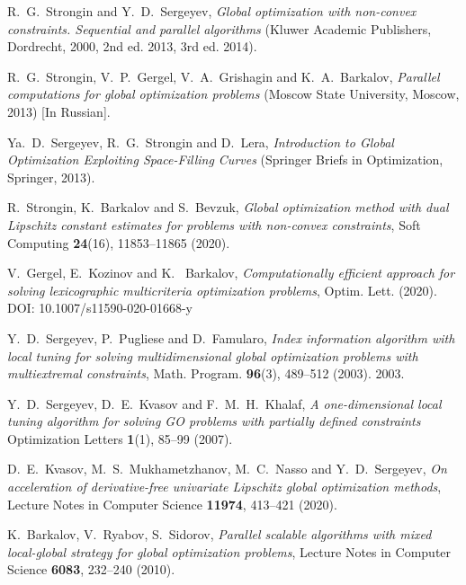 \documentclass[
11pt,%
tightenlines,%
twoside,%
onecolumn,%
nofloats,%
nobibnotes,%
nofootinbib,%
superscriptaddress,%
noshowpacs,%
centertags]%
{revtex4}
\begin{document}
\begin{thebibliography}{99}
	
R.~G.~Strongin and Y.~D.~Sergeyev, \textit{Global optimization with non-convex constraints. Sequential and parallel algorithms} (Kluwer Academic Publishers, Dordrecht, 2000, 2nd ed. 2013, 3rd ed. 2014).

R.~G.~Strongin, V.~P.~Gergel, V.~A.~Grishagin and K.~A.~Barkalov, \textit{Parallel computations for global optimization problems} (Moscow State University, Moscow, 2013) [In Russian].

Ya.~D.~Sergeyev, R.~G.~Strongin and D.~Lera, \textit{Introduction to Global Optimization Exploiting Space-Filling Curves} (Springer Briefs in Optimization, Springer, 2013).


R.~Strongin, K.~Barkalov and S.~Bevzuk, \textit{Global optimization method with dual Lipschitz constant estimates for problems with non-convex constraints}, Soft Computing \textbf{24}(16), 11853--11865 (2020).

V.~Gergel, E.~Kozinov and K.~ Barkalov, \textit{Computationally efficient approach for solving lexicographic multicriteria optimization problems}, Optim. Lett. (2020). DOI: 10.1007/s11590-020-01668-y 

Y.~D.~Sergeyev, P.~Pugliese and D.~Famularo, \textit{Index information algorithm with local tuning for solving multidimensional global optimization problems with multiextremal constraints}, Math. Program. \textbf{96}(3), 489--512 (2003).
2003.

Y.~D.~Sergeyev, D.~E.~Kvasov and F.~M.~H.~Khalaf, \textit{A one-dimensional local tuning algorithm for solving GO problems with partially defined constraints} Optimization Letters \textbf{1}(1), 85--99 (2007).

D.~E.~Kvasov, M.~S.~Mukhametzhanov, M.~C.~Nasso and Y.~D.~Sergeyev, \textit{On acceleration of derivative-free univariate Lipschitz global optimization methods}, Lecture Notes in Computer Science \textbf{11974}, 413--421 (2020).

K.~Barkalov, V.~Ryabov, S.~Sidorov, \textit{Parallel scalable algorithms with mixed local-global strategy for global optimization problems}, Lecture Notes in Computer Science \textbf{6083}, 232–240 (2010).
 

\end{thebibliography}
\end{document}
